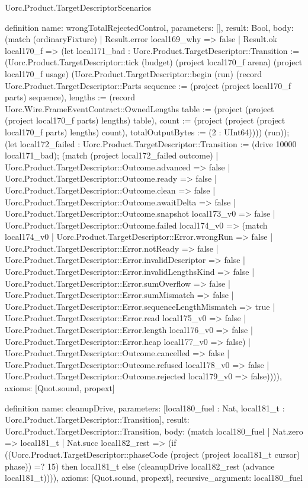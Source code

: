 \begin{lexlean}{Uorc.Product.TargetDescriptorScenarios}
\begin{semanticmodule}
definition{
  name: wrongTotalRejectedControl,
  parameters: [],
  result: Bool,
  body: (match (ordinaryFixture)
    | Result.error local169_why => false
    | Result.ok local170_f => (let local171_bad : Uorc.Product.TargetDescriptor::Transition := (Uorc.Product.TargetDescriptor::tick (budget) (project local170_f arena) (project local170_f usage) (Uorc.Product.TargetDescriptor::begin (run) (record Uorc.Product.TargetDescriptor::Parts {sequence := (project (project local170_f parts) sequence), lengths := (record Uorc.Wire.FrameEventContract::OwnedLengths {table := (project (project (project local170_f parts) lengths) table), count := (project (project (project local170_f parts) lengths) count), totalOutputBytes := (2 : UInt64)})})) (run)); (let local172_failed : Uorc.Product.TargetDescriptor::Transition := (drive 10000 local171_bad); (match (project local172_failed outcome)
      | Uorc.Product.TargetDescriptor::Outcome.advanced => false
      | Uorc.Product.TargetDescriptor::Outcome.ready => false
      | Uorc.Product.TargetDescriptor::Outcome.clean => false
      | Uorc.Product.TargetDescriptor::Outcome.awaitDelta => false
      | Uorc.Product.TargetDescriptor::Outcome.snapshot local173_v0 => false
      | Uorc.Product.TargetDescriptor::Outcome.failed local174_v0 => (match local174_v0
        | Uorc.Product.TargetDescriptor::Error.wrongRun => false
        | Uorc.Product.TargetDescriptor::Error.notReady => false
        | Uorc.Product.TargetDescriptor::Error.invalidDescriptor => false
        | Uorc.Product.TargetDescriptor::Error.invalidLengthsKind => false
        | Uorc.Product.TargetDescriptor::Error.sumOverflow => false
        | Uorc.Product.TargetDescriptor::Error.sumMismatch => false
        | Uorc.Product.TargetDescriptor::Error.sequenceLengthMismatch => true
        | Uorc.Product.TargetDescriptor::Error.read local175_v0 => false
        | Uorc.Product.TargetDescriptor::Error.length local176_v0 => false
        | Uorc.Product.TargetDescriptor::Error.heap local177_v0 => false)
      | Uorc.Product.TargetDescriptor::Outcome.cancelled => false
      | Uorc.Product.TargetDescriptor::Outcome.refused local178_v0 => false
      | Uorc.Product.TargetDescriptor::Outcome.rejected local179_v0 => false)))),
  axioms: [Quot.sound, propext]
}

definition{
  name: cleanupDrive,
  parameters: [local180_fuel : Nat, local181_t : Uorc.Product.TargetDescriptor::Transition],
  result: Uorc.Product.TargetDescriptor::Transition,
  body: (match local180_fuel
    | Nat.zero => local181_t
    | Nat.succ local182_rest => (if ((Uorc.Product.TargetDescriptor::phaseCode (project (project local181_t cursor) phase)) =? 15) then local181_t else (cleanupDrive local182_rest (advance local181_t)))),
  axioms: [Quot.sound, propext],
  recursive_argument: local180_fuel
}


\end{semanticmodule}
\end{lexlean}
